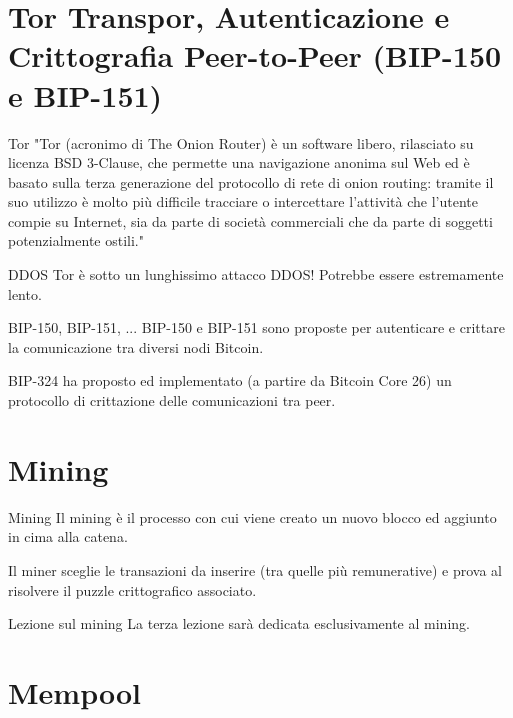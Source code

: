 \documentclass[aspectratio=169]{beamer}
\begin{document}
\section{Tor Transpor, Autenticazione e Crittografia Peer-to-Peer (BIP-150 e BIP-151)}

\begin{frame}{Tor}
    "Tor (acronimo di The Onion Router) è un software libero, rilasciato su licenza BSD 3-Clause, che permette una navigazione anonima sul Web ed è basato sulla terza generazione del protocollo di rete di onion routing: tramite il suo utilizzo è molto più difficile tracciare o intercettare l'attività che l'utente compie su Internet, sia da parte di società commerciali che da parte di soggetti potenzialmente ostili."

    \begin{alertblock}{DDOS}
        Tor è sotto un lunghissimo attacco DDOS! Potrebbe essere estremamente lento.
    \end{alertblock}
\end{frame}

\begin{frame}{BIP-150, BIP-151, ...}
    BIP-150 e BIP-151 sono proposte per autenticare e crittare la comunicazione tra diversi nodi Bitcoin. 

    BIP-324 ha proposto ed implementato (a partire da Bitcoin Core 26) un protocollo di crittazione delle comunicazioni tra peer.
\end{frame}

\section{Mining}

\begin{frame}{Mining}
    Il mining è il processo con cui viene creato un nuovo blocco ed aggiunto in cima alla catena.

    Il miner sceglie le transazioni da inserire (tra quelle più remunerative) e prova al risolvere il puzzle crittografico associato.

    \vspace{\baselineskip}

    \begin{alertblock}{Lezione sul mining}
        La terza lezione sarà dedicata esclusivamente al mining.
    \end{alertblock}
\end{frame}

\section{Mempool}
\end{document}
